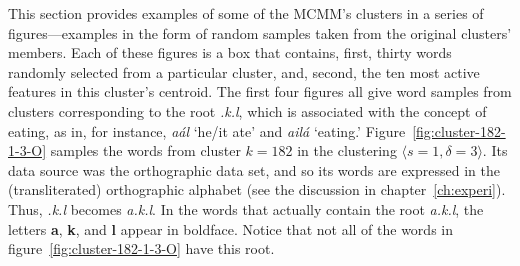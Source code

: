 This section provides examples of some of the MCMM's clusters in a series of figures---examples in the form of random samples taken from the original clusters' members. Each of these figures is a box that contains, first, thirty words randomly selected from a particular cluster,
and, second, the ten most active features in this cluster's centroid. 
The first four figures all give word samples from clusters corresponding to the root \textit{.k.l}, which is associated with the concept of eating, as in, for instance, \textit{a\'al} `he/it ate' and \textit{ail\'a} `eating.'  
Figure~\ref{fig:cluster-182-1-3-O} samples the words from cluster $k = 182$   
in the clustering $\langle s=1, \delta=3 \rangle$.
Its data source was the orthographic data set, and so its words are expressed in the (transliterated) orthographic alphabet (see the discussion in chapter~\ref{ch:experi}). Thus, \textit{.k.l} becomes \textit{a.k.l}.
In the words that actually contain the root \textit{a.k.l}, the letters \textbf{a}, \textbf{k}, and \textbf{l} appear in boldface.
Notice that not all of the words in figure~\ref{fig:cluster-182-1-3-O} have this root.

